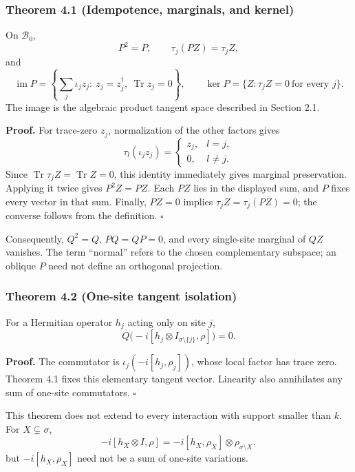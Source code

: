 \documentclass[
  11pt,
]{article}
\begin{document}
\subsubsection{Theorem 4.1 (Idempotence, marginals, and kernel)}\label{theorem-4.1-idempotence-marginals-and-kernel}

On \(\mathcal B_0\),
\[
P^2=P,\qquad \tau_j(PZ)=\tau_j Z,
\]
and
\[
\operatorname{im}P
 =\left\{\sum_j\iota_j z_j:\ z_j=z_j^\dagger,\
                 \operatorname{Tr}z_j=0\right\},
\qquad
\ker P=\{Z:\tau_j Z=0\ \text{for every }j\}.
\]
The image is the algebraic product tangent space described in Section 2.1.

\textbf{Proof.} For trace-zero \(z_j\), normalization of the other factors gives
\[
\tau_l(\iota_j z_j)=
\begin{cases}
z_j,&l=j,\\
0,&l\ne j.
\end{cases}
\]
Since \(\operatorname{Tr}\tau_j Z=\operatorname{Tr}Z=0\), this identity
immediately gives marginal preservation. Applying it twice gives \(P^2Z=PZ\).
Each \(PZ\) lies in the displayed sum, and \(P\) fixes every vector in that sum.
Finally, \(PZ=0\) implies \(\tau_j Z=\tau_j(PZ)=0\); the converse follows
from the definition. \(\square\)

Consequently, \(Q^2=Q\), \(PQ=QP=0\), and every single-site marginal of \(QZ\)
vanishes. The term ``normal'' refers to the chosen complementary subspace;
an oblique \(P\) need not define an orthogonal projection.

\subsubsection{Theorem 4.2 (One-site tangent isolation)}\label{theorem-4.2-one-site-tangent-isolation}

For a Hermitian operator \(h_j\) acting only on site \(j\),
\[
Q\bigl(-i[h_j\otimes I_{\sigma\setminus\{j\}},\rho]\bigr)=0.
\]

\textbf{Proof.} The commutator is
\(\iota_j(-i[h_j,\rho_j])\), whose local factor has trace zero.
Theorem 4.1 fixes this elementary tangent vector. Linearity also annihilates
any sum of one-site commutators. \(\square\)

This theorem does not extend to every interaction with support smaller
than \(k\). For \(X\subsetneq\sigma\),
\[
-i[h_X\otimes I,\rho]
 =-i[h_X,\rho_X]\otimes\rho_{\sigma\setminus X},
\]
but \(-i[h_X,\rho_X]\) need not be a sum of one-site variations.
\end{document}
